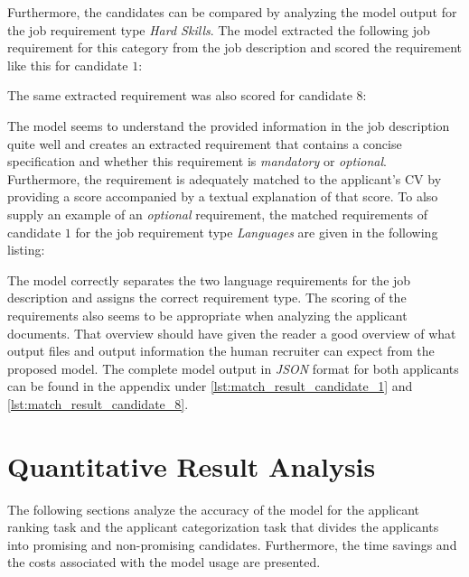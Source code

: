 \documentclass[draft,final]{thesisclass} %
\newcommand{\json}[2]{
    
}
\begin{document}
Furthermore, the candidates can be compared by analyzing the model output for the job requirement type \textit{Hard Skills}.
The model extracted the following job requirement for this category from the job description and scored the requirement like this for candidate $1$:
\json{candidate_1_hard_skills_result}{Requirement Matches of Type \textit{Hard Skills} for \textit{Bao Neilan}}
The same extracted requirement was also scored for candidate $8$:
\json{candidate_8_hard_skills_result}{Requirement Matches of Type \textit{Hard Skills} for \textit{Emanuelle Fought}}
The model seems to understand the provided information in the job description quite well and creates an extracted requirement that contains a concise specification and whether this requirement is \textit{mandatory} or \textit{optional}. Furthermore, the requirement is adequately matched to the applicant's \acs{CV} by providing a score accompanied by a textual explanation of that score. To also supply an example of an \textit{optional} requirement, the matched requirements of candidate $1$ for the job requirement type \textit{Languages} are given in the following listing:
\json{candidate_1_languages_result}{Requirement Matches of Type \textit{Languages} for \textit{Bao Neilan}}
The model correctly separates the two language requirements for the job description and assigns the correct requirement type. The scoring of the requirements also seems to be appropriate when analyzing the applicant documents. That overview should have given the reader a good overview of what output files and output information the human recruiter can expect from the proposed model. The complete model output in \textit{JSON} format for both applicants can be found in the appendix under \ref{lst:match_result_candidate_1} and \ref{lst:match_result_candidate_8}.

\section{Quantitative Result Analysis}
The following sections analyze the accuracy of the model for the applicant ranking task and the applicant categorization task that divides the applicants into promising and non-promising candidates. Furthermore, the time savings and the costs associated with the model usage are presented.
\end{document}

